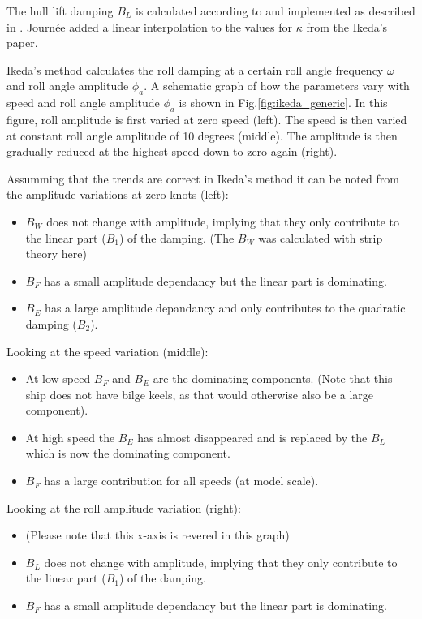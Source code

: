 \quad The hull lift damping $B_L$ is calculated according to
\citep{7505983/937PN5DT} and implemented as described in
\citep{7505983/UYUAYY7E}. Journ\'ee added a linear interpolation to the
values for $\kappa$ from the Ikeda's paper.

\quad Ikeda's method calculates the roll damping at a certain roll angle
frequency $\omega$ and roll angle amplitude $\phi_a$. A schematic
graph of how the parameters vary with speed and roll angle amplitude
$\phi_a$ is shown in Fig.\ref{fig:ikeda_generic}. In this
figure, roll amplitude is first varied at zero speed (left). The speed
is then varied at constant roll angle amplitude of 10 degrees (middle).
The amplitude is then gradually reduced at the highest speed down to
zero again (right).

\quad Assumming that the trends are correct in Ikeda's method it can be
noted from the amplitude variations at zero knots (left):

\begin{itemize}
\item $B_W$ does not change with amplitude, implying that they only contribute to the linear part ($B_1$) of the damping. (The $B_W$ was calculated with strip theory here)
\item $B_F$ has a small amplitude dependancy but the linear part is dominating.
\item $B_E$ has a large amplitude depandancy and only contributes to the quadratic damping ($B_2$)\citep{7505983/4AFVVGNT}.
\end{itemize}

\quad Looking at the speed variation (middle):

\begin{itemize}
\item At low speed $B_F$ and $B_E$ are the dominating components. (Note that this ship does not have bilge keels, as that would otherwise also be a large component).
\item At high speed the $B_E$ has almost disappeared and is replaced by the $B_L$ which is now the dominating component.
\item $B_F$ has a large contribution for all speeds (at model scale).
\end{itemize}

\quad Looking at the roll amplitude variation (right):

\begin{itemize}
\item (Please note that this x-axis is revered in this graph)
\item $B_L$ does not change with amplitude, implying that they only contribute to the linear part ($B_1$) of the damping.
\item $B_F$ has a small amplitude dependancy but the linear part is dominating.
\end{itemize}

